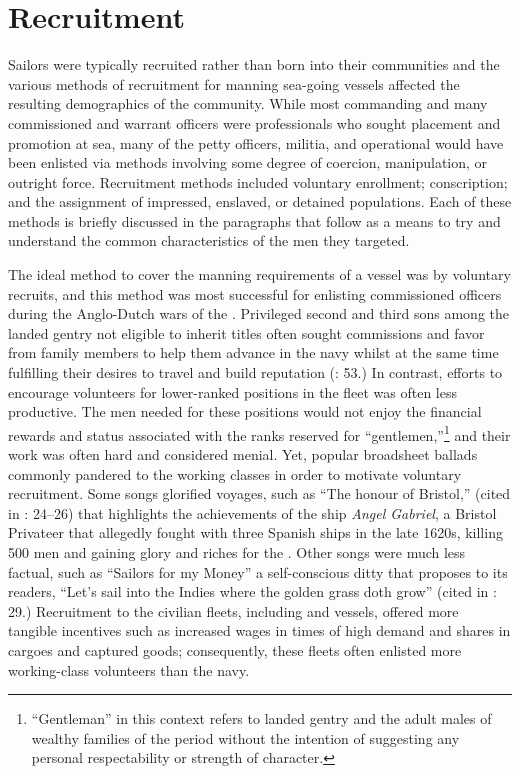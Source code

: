 \section{{Recruitment}}\label{sec:3.2}

  Sailors were typically recruited rather than born into their communities and the various methods of recruitment for manning sea-going vessels affected the resulting demographics of the community. While most commanding and many commissioned and warrant officers were professionals who sought placement and promotion at sea, many of the petty officers, militia, and operational  would have been enlisted via methods involving some degree of coercion, manipulation, or outright force. Recruitment methods included voluntary enrollment; conscription; and the assignment of impressed, enslaved, or detained populations. Each of these methods is briefly discussed in the paragraphs that follow as a means to try and understand the common characteristics of the men they targeted. 

  The ideal method to cover the manning requirements of a vessel was by voluntary recruits, and this method was most successful for enlisting commissioned officers during the Anglo-Dutch wars of the . Privileged second and third sons among the landed gentry not eligible to inherit titles often sought commissions and favor from family members to help them advance in the navy whilst at the same time fulfilling their desires to travel and build reputation (\citealt{Brown2011}: 53.) In contrast, efforts to encourage volunteers for lower-ranked positions in the fleet was often less productive. The men needed for these positions would not enjoy the financial rewards and status associated with the ranks reserved for “gentlemen,”\footnote{“Gentleman” in this context refers to landed gentry and the adult males of wealthy families of the period without the intention of suggesting any personal respectability or strength of character.}  and their work was often hard and considered menial. Yet, popular broadsheet ballads commonly pandered to the working classes in order to motivate voluntary recruitment. Some songs glorified voyages, such as “The honour of Bristol,” (cited in \citealt{Palmer1986}: 24--26) that highlights the achievements of the ship \textit{Angel Gabriel}, a Bristol Privateer that allegedly fought with three Spanish ships in the late 1620s, killing 500 men and gaining glory and riches for the . Other songs were much less factual, such as “Sailors for my Money” a self-conscious ditty that proposes to its readers, “Let’s sail into the Indies where the golden grass doth grow” (cited in \citealt{Palmer1986}: 29.) Recruitment to the civilian fleets, including  and  vessels, offered more tangible incentives such as increased wages in times of high demand and shares in cargoes and captured goods; consequently, these fleets often enlisted more working-class volunteers than the navy. 

